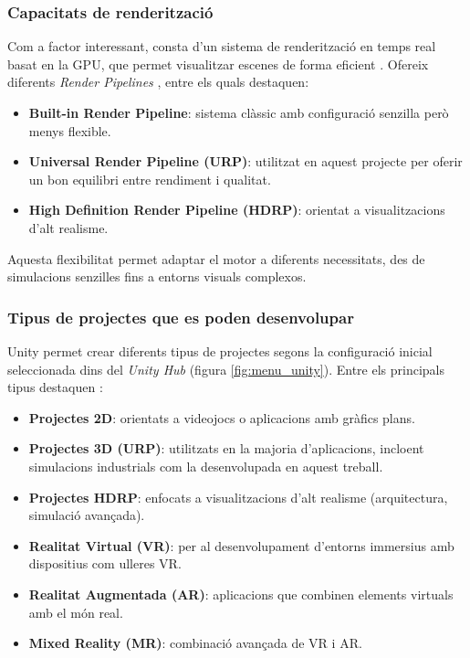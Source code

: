 \documentclass[a4paper,11pt,DIV=13,headings=normal,abstract=true,twoside=semi]{article}
\begin{document}
\subsubsection{Capacitats de renderització}
Com a factor interessant, consta d'un sistema de renderització en temps real basat en la GPU, que permet visualitzar escenes de forma eficient \cite{GPUWikipedia}. Ofereix diferents \textit{Render Pipelines} \cite{UnityRenderPipelines}, entre els quals destaquen:
\begin{itemize}
    \item \textbf{Built-in Render Pipeline}: sistema clàssic amb configuració senzilla però menys flexible.
    \item \textbf{Universal Render Pipeline (URP)}: utilitzat en aquest projecte per oferir un bon equilibri entre rendiment i qualitat.
    \item \textbf{High Definition Render Pipeline (HDRP)}: orientat a visualitzacions d'alt realisme.
\end{itemize}

Aquesta flexibilitat permet adaptar el motor a diferents necessitats, des de simulacions senzilles fins a entorns visuals complexos.

\subsubsection{Tipus de projectes que es poden desenvolupar}

Unity permet crear diferents tipus de projectes segons la configuració inicial seleccionada dins del \textit{Unity Hub} (figura \ref{fig:menu_unity}). Entre els principals tipus destaquen \cite{UnityProjectTemplates}:

\begin{itemize}
    \item \textbf{Projectes 2D}: orientats a videojocs o aplicacions amb gràfics plans.
    \item \textbf{Projectes 3D (URP)}: utilitzats en la majoria d'aplicacions, incloent simulacions industrials com la desenvolupada en aquest treball.
    \item \textbf{Projectes HDRP}: enfocats a visualitzacions d'alt realisme (arquitectura, simulació avançada).
    \item \textbf{Realitat Virtual (VR)}: per al desenvolupament d'entorns immersius amb dispositius com ulleres VR.
    \item \textbf{Realitat Augmentada (AR)}: aplicacions que combinen elements virtuals amb el món real.
    \item \textbf{Mixed Reality (MR)}: combinació avançada de VR i AR.
\end{itemize}
\end{document}
